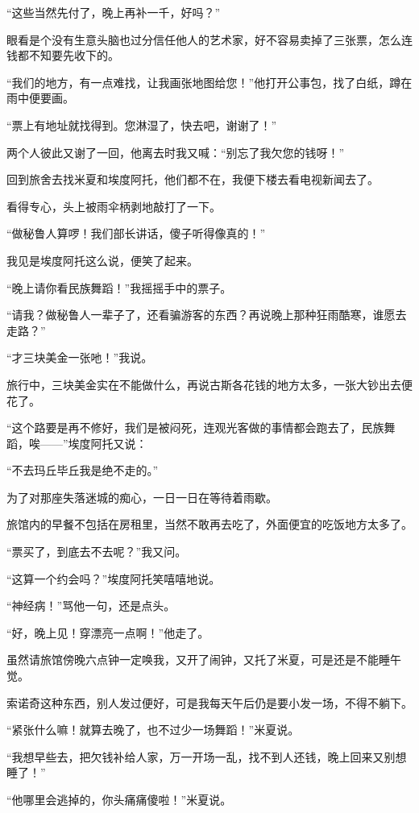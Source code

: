 \par “这些当然先付了，晚上再补一千，好吗？”
\par 眼看是个没有生意头脑也过分信任他人的艺术家，好不容易卖掉了三张票，怎么连钱都不知要先收下的。
\par “我们的地方，有一点难找，让我画张地图给您！”他打开公事包，找了白纸，蹲在雨中便要画。
\par “票上有地址就找得到。您淋湿了，快去吧，谢谢了！”
\par 两个人彼此又谢了一回，他离去时我又喊：“别忘了我欠您的钱呀！”
\par 回到旅舍去找米夏和埃度阿托，他们都不在，我便下楼去看电视新闻去了。
\par 看得专心，头上被雨伞柄剥地敲打了一下。
\par “做秘鲁人算啰！我们部长讲话，傻子听得像真的！”
\par 我见是埃度阿托这么说，便笑了起来。
\par “晚上请你看民族舞蹈！”我摇摇手中的票子。
\par “请我？做秘鲁人一辈子了，还看骗游客的东西？再说晚上那种狂雨酷寒，谁愿去走路？”
\par “才三块美金一张吔！”我说。
\par 旅行中，三块美金实在不能做什么，再说古斯各花钱的地方太多，一张大钞出去便花了。
\par “这个路要是再不修好，我们是被闷死，连观光客做的事情都会跑去了，民族舞蹈，唉——”埃度阿托又说：
\par “不去玛丘毕丘我是绝不走的。”
\par 为了对那座失落迷城的痴心，一日一日在等待着雨歇。
\par 旅馆内的早餐不包括在房租里，当然不敢再去吃了，外面便宜的吃饭地方太多了。
\par “票买了，到底去不去呢？”我又问。
\par “这算一个约会吗？”埃度阿托笑嘻嘻地说。
\par “神经病！”骂他一句，还是点头。
\par “好，晚上见！穿漂亮一点啊！”他走了。
\par 虽然请旅馆傍晚六点钟一定唤我，又开了闹钟，又托了米夏，可是还是不能睡午觉。
\par 索诺奇这种东西，别人发过便好，可是我每天午后仍是要小发一场，不得不躺下。
\par “紧张什么嘛！就算去晚了，也不过少一场舞蹈！”米夏说。
\par “我想早些去，把欠钱补给人家，万一开场一乱，找不到人还钱，晚上回来又别想睡了！”
\par “他哪里会逃掉的，你头痛痛傻啦！”米夏说。
